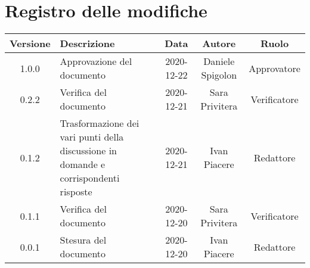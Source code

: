 \section*{Registro delle modifiche}

\begin{center}
	\begin{longtable}{|c|p{5cm}|c|c|c|}
	\hline
	\rowcolor{lighter-grayer}
	\textbf{Versione} & \textbf{Descrizione} & \textbf{Data} & \textbf{Autore} & \textbf{Ruolo} \\
	\hline
	\endfirsthead


	1.0.0 & Approvazione del documento & 2020-12-22 & Daniele Spigolon & Approvatore \\
	\hline
	0.2.2 & Verifica del documento & 2020-12-21 & Sara Privitera & Verificatore \\
	\hline
	0.1.2 & Trasformazione dei vari punti della discussione in domande e corrispondenti risposte & 2020-12-21 & Ivan Piacere & Redattore \\
	\hline
	0.1.1 & Verifica del documento & 2020-12-20 & Sara Privitera & Verificatore \\
	\hline
	0.0.1 & Stesura del documento & 2020-12-20 & Ivan Piacere & Redattore \\
	\hline
	\end{longtable}
\end{center}
